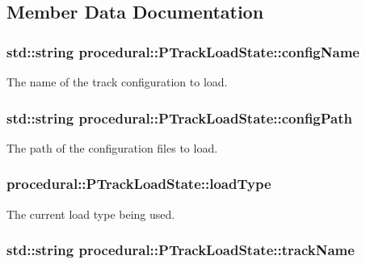 \subsection{Member Data Documentation}
\hypertarget{classprocedural_1_1_p_track_load_state_afd80455d3c2f9c84e2c76771d1c25e72}{
\subsubsection[{config\-Name}]{\setlength{\rightskip}{0pt plus 5cm}std\-::string procedural\-::\-P\-Track\-Load\-State\-::config\-Name\hspace{0.3cm}{\ttfamily [private]}}}\label{classprocedural_1_1_p_track_load_state_afd80455d3c2f9c84e2c76771d1c25e72}
The name of the track configuration to load. \hypertarget{classprocedural_1_1_p_track_load_state_aeae302c70abe6dd787b73a08e078fe7c}{
\subsubsection[{config\-Path}]{\setlength{\rightskip}{0pt plus 5cm}std\-::string procedural\-::\-P\-Track\-Load\-State\-::config\-Path\hspace{0.3cm}{\ttfamily [private]}}}\label{classprocedural_1_1_p_track_load_state_aeae302c70abe6dd787b73a08e078fe7c}
The path of the configuration files to load. \hypertarget{classprocedural_1_1_p_track_load_state_a7255f8b899cd930482de4f915cae8625}{
\subsubsection[{load\-Type}]{ procedural\-::\-P\-Track\-Load\-State\-::load\-Type\hspace{0.3cm}{\ttfamily [private]}}}\label{classprocedural_1_1_p_track_load_state_a7255f8b899cd930482de4f915cae8625}
The current load type being used. \hypertarget{classprocedural_1_1_p_track_load_state_ac7b267e5f292841da9e1f94d4e2cedaf}{
\subsubsection[{track\-Name}]{\setlength{\rightskip}{0pt plus 5cm}std\-::string procedural\-::\-P\-Track\-Load\-State\-::track\-Name\hspace{0.3cm}{\ttfamily [private]}}}\label{classprocedural_1_1_p_track_load_state_ac7b267e5f292841da9e1f94d4e2cedaf}

